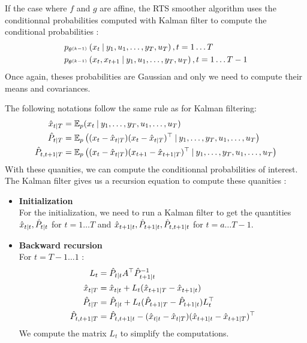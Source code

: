If the case where $f$ and $g$ are affine, the RTS smoother algorithm uses the conditionnal probabilities computed with Kalman filter to compute the conditional probabilities :
\begin{align*}
  &p_{\theta^{(k-1)}}\left(x_t \mathbin{\vert} y_1, u_1, \ldots, y_T, u_T \right), t=1 \ldots T\\
  &p_{\theta^{(k-1)}}\left(x_t, x_{t+1} \mathbin{\vert} y_1, u_1, \ldots, y_T, u_T \right), t=1 \ldots T-1\\
\end{align*}
Once again, theses probabilities are Gaussian and only we need to compute their means and covariances.

The following notations follow the same rule as for Kalman filtering:
\begin{align*}
  \hat{x}_{t \mathbin{\vert} T} &= \mathbb{E}_p(x_t \mathbin{\vert} y_1, \ldots , y_T, u_1, \ldots , u_T) \\
  \hat{P}_{t \mathbin{\vert} T} &= \mathbb{E}_p \left((x_t - \hat{x}_{t \mathbin{\vert} T})(x_t - \hat{x}_{t \mathbin{\vert} T})^{\top} \mathbin{\vert} y_1, \ldots , y_T, u_1, \ldots , u_T \right) \\
  \hat{P}_{t,t+1 \mathbin{\vert} T} &= \mathbb{E}_p \left((x_t - \hat{x}_{t \mathbin{\vert} T})(x_{t+1} - \hat{x}_{t+1 \mathbin{\vert} T})^{\top} \mathbin{\vert} y_1, \ldots , y_T, u_1, \ldots , u_T \right) \\
\end{align*}
With these quanities, we can compute the conditionnal probabilities of interest.
The Kalman filter gives us a recursion equation to compute these quanities :
\begin{itemize}
  \item \textbf{Initialization}\\
    For the initialization, we need to run a Kalman filter to get the quantities $\hat{x}_{t \mathbin{\vert} t}, \hat{P}_{t \mathbin{\vert} t}$ for $t=1 \ldots T$ and $\hat{x}_{t+1 \mathbin{\vert} t}, \hat{P}_{t+1 \mathbin{\vert} t}, \hat{P}_{t,t+1 \mathbin{\vert} t}$ for $t=a \ldots T-1$.
  \item \textbf{Backward recursion}\\
    For $t=T-1 \ldots 1$ :
    \begin{align*}
      L_t &= \hat{P}_{t \mathbin{\vert} t}A^{\top}\hat{P}_{t+1 \mathbin{\vert} t}^{-1}\\
      \hat{x}_{t \mathbin{\vert} T} &= \hat{x}_{t \mathbin{\vert} t} + L_t(\hat{x}_{t+1 \mathbin{\vert} T} - \hat{x}_{t+1 \mathbin{\vert} t})\\
      \hat{P}_{t \mathbin{\vert} T} &= \hat{P}_{t \mathbin{\vert} t} + L_t(\hat{P}_{t+1 \mathbin{\vert} T} - \hat{P}_{t+1 \mathbin{\vert} t})L_t^{\top}\\
      \hat{P}_{t,t+1 \mathbin{\vert} T} &= \hat{P}_{t,t+1 \mathbin{\vert} t} - (\hat{x}_{t \mathbin{\vert} t} - \hat{x}_{t \mathbin{\vert} T})(\hat{x}_{t+1 \mathbin{\vert} t} - \hat{x}_{t+1 \mathbin{\vert} T})^{\top}\\
    \end{align*}
    We compute the matrix $L_{t}$ to simplify the computations.
\end{itemize}

